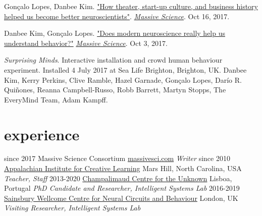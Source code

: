 \documentclass[]{friggeri-cv}
\begin{document}
\vspace{2mm}
Gon\c{c}alo Lopes, Danbee Kim. \href{https://massivesci.com/articles/neuroscience-can-learn-from-theater/}{"How theater, start-up culture, and business history helped us become better neuroscientists"}. \emph{\href{https://massivesci.com}{Massive Science}}. Oct 16, 2017.

\vspace{2mm}
Danbee Kim, Gon\c{c}alo Lopes. \href{https://massivesci.com/articles/neuroscience-behavior-vs-technology/}{"Does modern neuroscience really help us understand behavior?"} \emph{\href{https://massivesci.com}{Massive Science}}. Oct 3, 2017. 

\vspace{2mm}
\emph{Surprising Minds}. Interactive installation and crowd human behaviour experiment. Installed 4 July 2017 at Sea Life Brighton, Brighton, UK. Danbee Kim, Kerry Perkins, Clive Ramble, Hazel Garnade, Gon\c{c}alo Lopes, Dar\'{i}o R. Qui\~{n}ones, Reanna Campbell-Russo, Robb Barrett, Martyn Stopps, The EveryMind Team, Adam Kampff.

\section{experience}

\begin{entrylist}
  \entry
    {since 2017}
    {Massive Science Consortium}
    {\href{massivesci.com}{massivesci.com}}
    {\emph{Writer}}
  \entry
    {since 2010}
    {\href{http://www.appalachianinstitute.org/}{Appalachian Institute for Creative Learning}}
    {Mars Hill, North Carolina, USA}
    {\emph{Teacher, Staff}}
  \entry
    {2013-2020}
    {\href{http://neuro.fchampalimaud.org/en/research/investigators/research-groups/group/Kampff/}{Champalimaud Centre for the Unknown}}
    {Lisboa, Portugal}
    {\emph{PhD Candidate and Researcher, Intelligent Systems Lab}}
  \entry
    {2016-2019}
    {\href{https://www.ucl.ac.uk/swc/}{Sainsbury Wellcome Centre for Neural Circuits and Behaviour}}
    {London, UK}
    {\emph{Visiting Researcher, Intelligent Systems Lab}}
\end{entrylist}

\newpage
\end{document}
